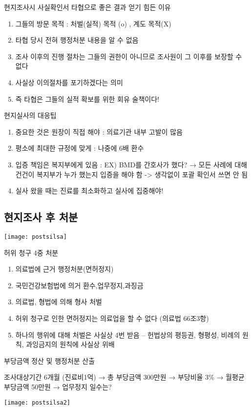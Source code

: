 현지조사시 사실확인서 타협으로 좋은 결과 얻기 힘든 이유 
\begin{enumerate}[1)]\tightlist
\item 그들의 방문 목적 : 처벌(실적) 목적 (o) , 계도 목적(X)
\item 타협 당시 전혀 행정처분 내용을 알 수 없음
\item 조사 이후의 진행 절차는 그들의 권한이 아니므로 조사원이 그 이후를 보장할 수 없다 
\item 사실상 이의절차를 포기하겠다는 의미 
\item 즉 타협은 그들의 실적 확보를 위한 회유 술책이다!  
\end{enumerate}

현지실사의 대응팁
\begin{enumerate}[1)]\tightlist
\item 중요한 것은 원장이 직접 해야 : 의료기관 내부 고발이 많음
\item 평소에 최대한 규정에 맞게 : 나중에 6배 환수
\item 입증 책임은 복지부에게 있음 :  EX) BMD를 간호사가 했다?  → 모든 사례에 대해 건건이 복지부가 누가 했는지 입증을 해야 함 -> 생각없이 포괄 확인서 쓰면 안 됨 
\item 실사 왔을 때는 진료를 최소화하고 실사에 집중해야!
\end{enumerate}

\subsection{현지조사 후 처분 }
\texttt{[image: postsilsa]}

허위 청구 4중 처분  
\begin{enumerate}[1)]\tightlist
\item 의료법에 근거 행정처분(면허정지)
\item 국민건강보험법에 의거 환수,업무정지,과징금
\item 의료법, 형법에 의해 형사 처벌
\item 허위 청구로 인한 면허정지는 의료업을 할 수 없다 (의료법 66조3항)
\item 하나의 행위에 대해 처벌은 사실상 4번 받음 – 헌법상의 평등권, 형평성, 비례의 원칙, 과잉금지의 원칙에 사실상 위배
\end{enumerate}

부당금액 정산 및 행정처분 산출\par 
조사대상기간 6개월 (진료비1억) → 총 부당금액 300만원 → 부당비율 3\% → 월평균부당금액 50만원 → 업무정지 일수는?\par
\texttt{[image: postsilsa2]}\par


